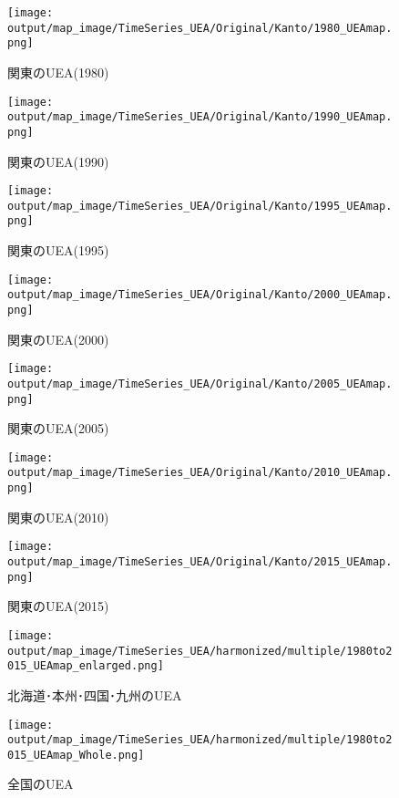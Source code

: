\documentclass{ltjsarticle}
\begin{document}
\begin{figure}[pbth]
  \centering
  \texttt{[image: output/map\_image/TimeSeries\_UEA/Original/Kanto/1980\_UEAmap.png]}
  \caption{\label{ori:1980UEA:kan}関東のUEA(1980)}
\end{figure}
\begin{figure}[pbth]
  \centering
  \texttt{[image: output/map\_image/TimeSeries\_UEA/Original/Kanto/1990\_UEAmap.png]}
  \caption{\label{ori:1990UEA:kan}関東のUEA(1990)}
\end{figure}
\begin{figure}[pbth]
  \centering
  \texttt{[image: output/map\_image/TimeSeries\_UEA/Original/Kanto/1995\_UEAmap.png]}
  \caption{\label{ori:1995UEA:kan}関東のUEA(1995)}
\end{figure}
\begin{figure}[pbth]
  \centering
  \texttt{[image: output/map\_image/TimeSeries\_UEA/Original/Kanto/2000\_UEAmap.png]}
  \caption{\label{ori:2000UEA:kan}関東のUEA(2000)}
\end{figure}
\begin{figure}[pbth]
  \centering
  \texttt{[image: output/map\_image/TimeSeries\_UEA/Original/Kanto/2005\_UEAmap.png]}
  \caption{\label{ori:2005UEA:kan}関東のUEA(2005)}
\end{figure}
\begin{figure}[pbth]
  \centering
  \texttt{[image: output/map\_image/TimeSeries\_UEA/Original/Kanto/2010\_UEAmap.png]}
  \caption{\label{ori:2010UEA:kan}関東のUEA(2010)}
\end{figure}
\begin{figure}[pbth]
  \centering
  \texttt{[image: output/map\_image/TimeSeries\_UEA/Original/Kanto/2015\_UEAmap.png]}
  \caption{\label{ori:2015UEA:kan}関東のUEA(2015)}
\end{figure}

\begin{figure}[pbth]
  \centering
  \texttt{[image: output/map\_image/TimeSeries\_UEA/harmonized/multiple/1980to2015\_UEAmap\_enlarged.png]}
  \caption{\label{ham:tsUEA:enl}北海道･本州･四国･九州のUEA}
\end{figure}

\begin{figure}[pbth]
  \centering
  \texttt{[image: output/map\_image/TimeSeries\_UEA/harmonized/multiple/1980to2015\_UEAmap\_Whole.png]}
  \caption{\label{ham:tsUEA:who}全国のUEA}
\end{figure}
\end{document}
